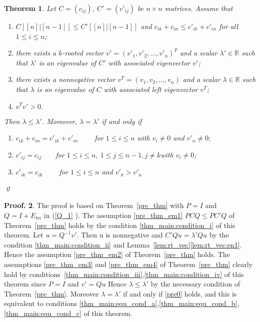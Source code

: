 \documentclass[12pt]{report}
\theoremstyle{plain}
\newtheorem{thm}{Theorem}[section]
\theoremstyle{definition}
\newtheorem{pof}[thm]{Proof.}
\begin{document}
\begin{thm} \label{thm_main}
    Let $C=(c_{ij})$, $C'=(c'_{ij})$ be  $n\times n$ matrices.
Assume that
\begin{enumerate}[label=(\roman*)]
\item \label{thm_main:condition_i} $C[[n]|[n-1]]\leq C'[[n]|[n-1]]$ and $c_{ik}+c_{in}\leq c'_{ik}+c'_{in}$ for all $1\leq i\leq n$;
\item \label{thm_main:condition_ii}there exists a $k$-rooted vector $v'=(v'_1, v'_2, \ldots, v'_n)^T$ and a scalar $\lambda'\in \mathbb{R}$
such that $\lambda'$ is an eigenvalue of $C'$ with associated eigenvector $v'$;
\item \label{thm_main:condition_iii} there exists a nonnegative vector $v^T=(v_1, v_2, \ldots, v_n)$ and a scalar $\lambda\in \mathbb{R}$ such that $\lambda$ is an eigenvalue of $C$ with associated left eigenvector $v^T$;
\item \label{thm_main:condition_iv} $v^Tv'>0.$
\end{enumerate}
 Then $\lambda\leq \lambda'$.
Moreover, $\lambda=\lambda'$
if and only if
\begin{enumerate}[label=(\alph*)]
\item  \label{thm_main:equ_cond_a} $c_{ik}+c_{in}=c'_{ik}+c'_{in} \qquad$  for $1\leq i\leq n$ with $v_i\not=0$ and $v'_n\not=0;$
\item \label{thm_main:equ_cond_b} $c'_{ij}=c_{ij}\qquad $for $1\leq i\leq n,~1\leq j\leq n-1, j \neq k $with $v_i\ne 0 $;
\item \label{thm_main:equ_cond_c} $c'_{ik}=c_{ik} \qquad $  for $1\leq i \leq n$ and $ v'_{k}>v'_n$ 
\end{enumerate} \qed
\end{thm}

\begin{pof}
The proof is based on Theorem~\ref{pre_thm} with $P = I$ and $Q = I + E_{kn}$ in (\ref{Q_1} ). 
The assumption \ref{pre_thm_em1} $PCQ\leq PC'Q$ of Theorem~\ref{pre_thm} holds by the condition \ref{thm_main:condition_i} of this theorem. 
Let $u = Q^{-1}v'$. Then u is nonnegative and $C'Qu = \lambda' Qu$ by the condition \ref{thm_main:condition_ii} and
 Lemma~\ref{lem:rt_vec}\ref{lem:rt_vec:en1}. Hence the assumption \ref{pre_thm_em2} of Theorem~\ref{pre_thm} holds. The assumptions \ref{pre_thm_em3} and \ref{pre_thm_em4}
  of Theorem~\ref{pre_thm} clearly hold by conditions~\ref{thm_main:condition_iii},\ref{thm_main:condition_iv} of this theorem since $P = I$ and
   $v'= Qu$  Hence $\lambda \leq \lambda' $ by the necessary condition of Theorem~\ref{pre_thm}. Moreover
    $\lambda = \lambda'$ if and only if \ref{pre0} holds, and this is equivalent to
     conditions \ref{thm_main:equ_cond_a},\ref{thm_main:equ_cond_b},\ref{thm_main:equ_cond_c} of this theorem. 
\end{pof}
\end{document}
